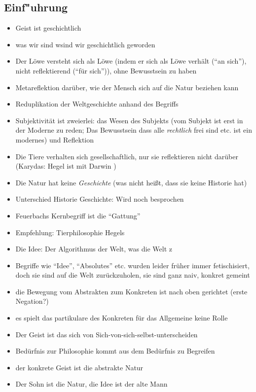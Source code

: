 \documentclass[emulatestandardclasses]{scrartcl}
\begin{document}
\subsection{Einf"uhrung}

\begin{itemize}
  \item Geist ist geschichtlich
  \item was wir sind wsind wir geschichtlich geworden
  \item Der Löwe versteht sich als Löwe (indem er sich als Löwe verhält ("`an sich"'), nicht reflektierend ("`für sich"')), ohne Bewusstsein zu haben
  \item Metareflektion darüber, wie der Mensch sich auf die Natur beziehen kann
  \item Reduplikation der Weltgeschichte anhand des Begriffs
  \item Subjektivität ist zweierlei: das Wesen des Subjekts (vom Subjekt ist erst in der Moderne zu reden; Das Bewusstsein dass alle \emph{rechtlich} frei sind etc. ist ein modernes) und Reflektion
  \item Die Tiere verhalten sich gesellschaftlich, nur sie reflektieren nicht darüber (Karydas: Hegel ist mit Darwin )
  \item Die Natur hat keine \emph{Geschichte} (was nicht heißt, dass sie keine Historie hat)
  \item Unterschied Historie Geschichte: Wird noch besprochen
  \item Feuerbachs Kernbegriff ist die "`Gattung"'
  \item Empfehlung: Tierphilosophie Hegels
  \item Die Idee: Der Algorithmus der Welt, was die Welt z
  \item Begriffe wie "`Idee"', "`Absolutes"' etc. wurden leider früher immer fetischisiert, doch sie sind auf die Welt zurückzuholen, sie sind ganz naiv, konkret gemeint
  \item die Bewegung vom Abstrakten zum Konkreten ist nach oben gerichtet (erste Negation?)
  \item es spielt das partikulare des Konkreten für das Allgemeine keine Rolle
  \item Der Geist ist das sich von Sich-von-sich-selbst-unterscheiden
  \item Bedürfnis zur Philosophie kommt aus dem Bedürfnis zu Begreifen
  \item der konkrete Geist ist die abstrakte Natur
  \item Der Sohn ist die Natur, die Idee ist der alte Mann
\end{itemize}
\end{document}
